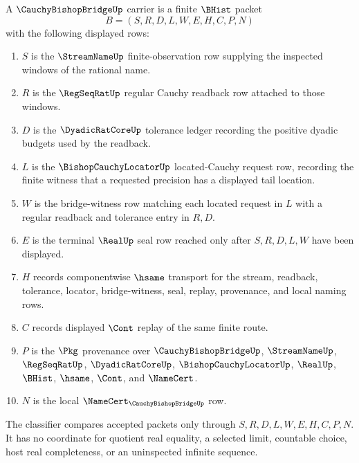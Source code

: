 \begin{definition}
\label{def:cauchy-bishop-bridge-carrier}
A $\CauchyBishopBridgeUp$ carrier is a finite $\BHist$ packet
$$
B=(S,R,D,L,W,E,H,C,P,N)
$$
with the following displayed rows:
\begin{enumerate}
\item $S$ is the $\StreamNameUp$ finite-observation row supplying the inspected windows of the rational name.
\item $R$ is the $\RegSeqRatUp$ regular Cauchy readback row attached to those windows.
\item $D$ is the $\DyadicRatCoreUp$ tolerance ledger recording the positive dyadic budgets used by the readback.
\item $L$ is the $\BishopCauchyLocatorUp$ located-Cauchy request row, recording the finite witness that a requested precision has a displayed tail location.
\item $W$ is the bridge-witness row matching each located request in $L$ with a regular readback and tolerance entry in $R,D$.
\item $E$ is the terminal $\RealUp$ seal row reached only after $S,R,D,L,W$ have been displayed.
\item $H$ records componentwise $\hsame$ transport for the stream, readback, tolerance, locator, bridge-witness, seal, replay, provenance, and local naming rows.
\item $C$ records displayed $\Cont$ replay of the same finite route.
\item $P$ is the $\Pkg$ provenance over $\CauchyBishopBridgeUp$, $\StreamNameUp$, $\RegSeqRatUp$, $\DyadicRatCoreUp$, $\BishopCauchyLocatorUp$, $\RealUp$, $\BHist$, $\hsame$, $\Cont$, and $\NameCert$.
\item $N$ is the local $\NameCert_{\CauchyBishopBridgeUp}$ row.
\end{enumerate}
The classifier compares accepted packets only through $S,R,D,L,W,E,H,C,P,N$. It has no coordinate for quotient real equality, a selected limit, countable choice, host real completeness, or an uninspected infinite sequence.
\end{definition}


